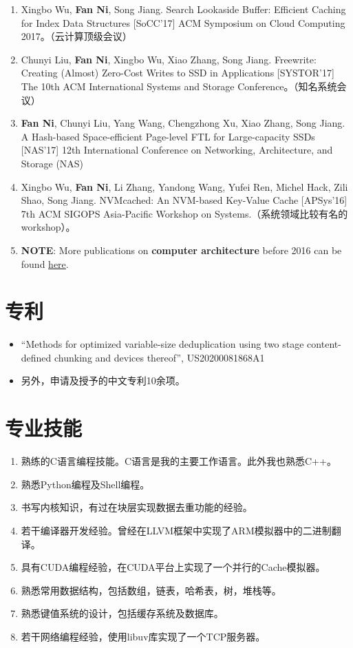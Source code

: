 \documentclass{article}
\begin{document}
\begin{enumerate}
\item Xingbo Wu, \textbf{Fan Ni}, Song Jiang. Search Lookaside Buffer: Efficient Caching for Index Data Structures [SoCC'17] ACM Symposium on Cloud Computing 2017。（云计算顶级会议）
\item Chunyi Liu, \textbf{Fan Ni}, Xingbo Wu, Xiao Zhang, Song Jiang. Freewrite: Creating (Almost) Zero-Cost Writes to SSD in Applications [SYSTOR'17] The 10th ACM International Systems and Storage Conference。（知名系统会议）
\item \textbf{Fan Ni}, Chunyi Liu, Yang Wang, Chengzhong Xu, Xiao Zhang, Song Jiang. A Hash-based Space-efficient Page-level FTL for Large-capacity SSDs [NAS'17] 12th International Conference on Networking, Architecture, and Storage (NAS)
\item Xingbo Wu, \textbf{Fan Ni}, Li Zhang, Yandong Wang, Yufei Ren, Michel Hack, Zili Shao, Song Jiang. NVMcached: An NVM-based Key-Value Cache [APSys'16] 7th ACM SIGOPS Asia-Pacific Workshop on Systems.（系统领域比较有名的workshop）。
\item \textbf{NOTE}: More publications on \textbf{computer architecture} before 2016 can be found \href{https://scholar.google.com/citations?user=xMbxve0AAAAJ&hl=en}{here}.
\end{enumerate}
    

\section{专利}
\begin{itemize}
    \item “Methods for optimized variable-size deduplication using two stage content-defined
chunking and devices thereof”, US20200081868A1
    \item 另外，申请及授予的中文专利10余项。
\end{itemize}



\section{专业技能}
\begin{enumerate}
\item	熟练的C语言编程技能。C语言是我的主要工作语言。此外我也熟悉C++。
\item	熟悉Python编程及Shell编程。
\item	书写内核知识，有过在块层实现数据去重功能的经验。
\item	若干编译器开发经验。曾经在LLVM框架中实现了ARM模拟器中的二进制翻译。
\item	具有CUDA编程经验，在CUDA平台上实现了一个并行的Cache模拟器。
\item	熟悉常用数据结构，包括数组，链表，哈希表，树，堆栈等。
\item   熟悉键值系统的设计，包括缓存系统及数据库。
\item	若干网络编程经验，使用libuv库实现了一个TCP服务器。
\end{enumerate}
\end{document}
